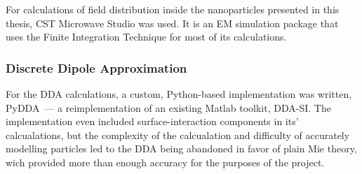         For calculations of field distribution inside the nanoparticles presented in this thesis, CST Microwave Studio was used.
        It is an  EM simulation package that uses the Finite Integration Technique for most of its calculations.

        \subsubsection{Discrete Dipole Approximation}
        \label{subsec:DDA}

                For the DDA calculations, a custom, Python-based implementation was written, PyDDA~--- a reimplementation of an existing
            Matlab toolkit, DDA-SI\cite{loke2011discrete}. The implementation even included surface-interaction components in its' calcualations,
            but the complexity of the calcualation and difficulty of accurately modelling particles led to the DDA being abandoned in favor of plain
            Mie theory, wich provided more than enough accuracy for the purposes of the project.

